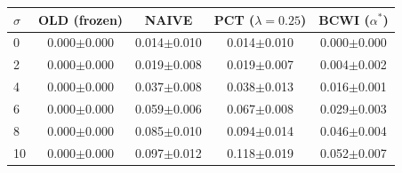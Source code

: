 \begin{tabular}{lcccc}
\toprule
$\sigma$ & OLD (frozen) & NAIVE & PCT ($\lambda{=}0.25$) & BCWI ($\alpha^*$) \\
\midrule
0 & 0.000$\pm$0.000 & 0.014$\pm$0.010 & 0.014$\pm$0.010 & 0.000$\pm$0.000 \\
2 & 0.000$\pm$0.000 & 0.019$\pm$0.008 & 0.019$\pm$0.007 & 0.004$\pm$0.002 \\
4 & 0.000$\pm$0.000 & 0.037$\pm$0.008 & 0.038$\pm$0.013 & 0.016$\pm$0.001 \\
6 & 0.000$\pm$0.000 & 0.059$\pm$0.006 & 0.067$\pm$0.008 & 0.029$\pm$0.003 \\
8 & 0.000$\pm$0.000 & 0.085$\pm$0.010 & 0.094$\pm$0.014 & 0.046$\pm$0.004 \\
10 & 0.000$\pm$0.000 & 0.097$\pm$0.012 & 0.118$\pm$0.019 & 0.052$\pm$0.007 \\
\bottomrule
\end{tabular}